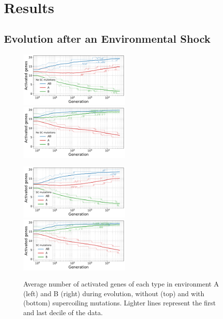 \section{Results}

\subsection{Evolution after an Environmental Shock}

\begin{figure}[H]
\centering
\includegraphics[width=0.495\textwidth]{epistasis/img/control/gene_activity_env_A.pdf}
\includegraphics[width=0.495\textwidth]{epistasis/img/control/gene_activity_env_B.pdf}

\includegraphics[width=0.495\textwidth]{epistasis/img/with-sc/gene_activity_env_A.pdf}
\includegraphics[width=0.495\textwidth]{epistasis/img/with-sc/gene_activity_env_B.pdf}
\caption[Evolution of the number of activated genes in each environment, with a]{Average number of activated genes of each type in environment A (left) and B (right) during evolution, without (top) and with (bottom) supercoiling mutations.
Lighter lines represent the first and last decile of the data.}
\label{fig:epistasis:activ-by-env}
\end{figure}

